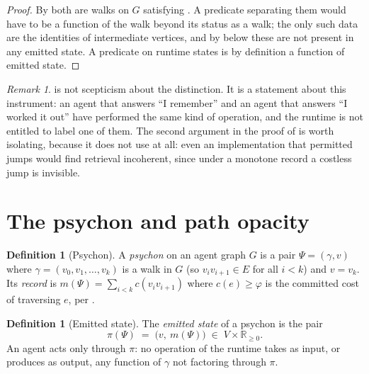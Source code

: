\documentclass[11pt,a4paper]{article}
\theoremstyle{clstyle}
\theoremstyle{definition}
\newtheorem{definition}[theorem]{Definition}
\theoremstyle{remark}
\newtheorem{remark}[theorem]{Remark}
\newcommand{\R}{\mathbb{R}}
\newcommand{\rec}{m}
\newcommand{\Psy}{\Psi}                  %
\newcommand{\traj}{\gamma}               %
\newcommand{\term}{v}                    %
\begin{document}
\begin{proof}
By  both are walks on $G$ satisfying
. A predicate separating them would have to be a
function of the walk beyond its status as a walk; the only such data are the
identities of intermediate vertices, and by  below these
are not present in any emitted state. A predicate on runtime states is by
definition a function of emitted state.
\end{proof}

\begin{remark}
 is not scepticism about the distinction. It is a
statement about this instrument: an agent that answers ``I remember'' and an
agent that answers ``I worked it out'' have performed the same kind of
operation, and the runtime is not entitled to label one of them. The second
argument in the proof of  is worth isolating, because
it does not use  at all: even an implementation that
permitted jumps would find retrieval incoherent, since under a monotone
record a costless jump is invisible.
\end{remark}

\section{The psychon and path opacity}
\label{sec:psychon}

\begin{definition}[Psychon]
\label{def:psychon}
A \emph{psychon} on an agent graph $G$ is a pair $\Psy=(\traj,\term)$ where
$\traj=(v_0,v_1,\dots,v_k)$ is a walk in $G$ (so $v_{i}v_{i+1}\in E$ for all
$i<k$) and $\term=v_k$. Its \emph{record} is
$\rec(\Psy)=\sum_{i<k}c(v_iv_{i+1})$ where $c(e)\ge\varphi$ is the committed
cost of traversing $e$, per .
\end{definition}

\begin{definition}[Emitted state]
\label{def:emitted}
The \emph{emitted state} of a psychon is the pair
\begin{equation}
\pi(\Psy) \;=\; \bigl(\term,\ \rec(\Psy)\bigr) \;\in\; V\times\R_{\ge0}.
\end{equation}
An agent acts only through $\pi$: no operation of the runtime takes as
input, or produces as output, any function of $\traj$ not factoring through
$\pi$.
\end{definition}
\end{document}
